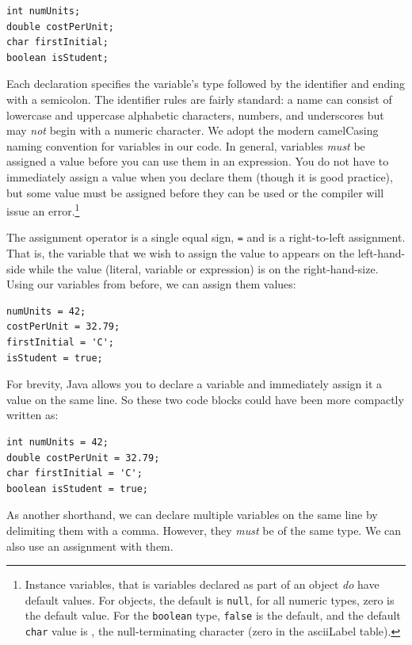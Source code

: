 \begin{verbatim}
int numUnits;
double costPerUnit;
char firstInitial;
boolean isStudent;
\end{verbatim}

Each declaration specifies the variable's type followed by the 
identifier and ending with a semicolon.  The identifier rules are 
fairly standard: a name can consist of lowercase and uppercase 
alphabetic characters, numbers, and underscores but may 
\emph{not} begin with a numeric character.  We adopt the 
modern camelCasing naming convention for variables in our 
code.  In general, variables \emph{must} be assigned a value before
you can use them
in an expression.  You do not have to immediately assign a value
when you declare them (though it is good practice), but some value
must be assigned before they can be used or the compiler
will issue an error.\footnote{Instance variables, that is variables
declared as part of an object \emph{do} have default values.
For objects, the default is \texttt{null}, for all numeric 
types, zero is the default value.  For the \texttt{boolean} 
type, \texttt{false} is the default, and the default 
\texttt{char} value is \texttt{\0}, the 
null-terminating character (zero in the \gls{asciiLabel} table).}

The assignment operator is a single equal sign, \texttt{=} and is a right-to-left
assignment.  That is, the variable that we wish to assign the value to appears on the
left-hand-side while the value (literal, variable or expression) is on the right-hand-size.
Using our variables from before, we can assign them values:

\begin{verbatim}
numUnits = 42;
costPerUnit = 32.79;
firstInitial = 'C';
isStudent = true;
\end{verbatim}

For brevity, Java allows you to declare a variable and immediately assign 
it a value on the same line.  So these two code blocks could have been 
more compactly written as:

\begin{verbatim}
int numUnits = 42;
double costPerUnit = 32.79;
char firstInitial = 'C';
boolean isStudent = true;
\end{verbatim}

As another shorthand, we can declare multiple variables on the same line by delimiting
them with a comma.  However, they \emph{must} be of the same type.  We can also 
use an assignment with them. 

